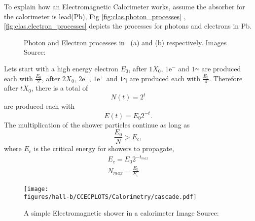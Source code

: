 To explain how an Electromagnetic Calorimeter works, assume the absorber for the calorimeter is lead(Pb), Fig \ref{fig:clas.photon_processes} , \ref{fig:clas.electron_processes} depicts the processes for photons and electrons in Pb.
\begin{figure}[h!]\begin{center}
\caption[Photon and Electron processes in ]{Photon and Electron processes in ~(a) and (b) respectively. Images Source:~\cite{vibe_levels}} 

\end{center}\end{figure}
Lets start with a high energy electron $E_{0}$, after $1 X_{0}$, $\mathrm{1e^{-}}$ and $\mathrm{1 \gamma}$ are produced each with $\frac{E_{0}}{2}$, after $2 X_{0}$, $\mathrm{2e^{-}}$, $\mathrm{1e^{+}}$ and $\mathrm{1 \gamma}$ are produced each with $\frac{E_{0}}{4}$. Therefore after $tX_{0}$, there is a total of 
\begin{equation}
N(t)=2^{t}
\end{equation}
are produced each with
\begin{equation}
E(t) = E_{0}2^{-t}.
\end{equation}
The multiplication of the shower particles continue as long as
\begin{equation}
\frac{E_{0}}{N} > E_{c},
\end{equation}
where $E_{c}$ is the critical energy for showers to propagate,
\begin{align}
E_{c}  = E_{0}2^{-t_{max}} \\
N_{max}=\frac{E_{0}}{E_{c}}
\end{align}

\begin{figure}[h!]\begin{center}
\texttt{[image: \\figures/hall-b/CCECPLOTS/Calorimetry/cascade.pdf]}
\caption[A simple Electromagnetic shower in a calorimeter]{\label{fig:clas.ec.shower}{A simple Electromagnetic shower in a calorimeter} Image Source:~\cite{vibe_levels} }
\end{center}\end{figure}

